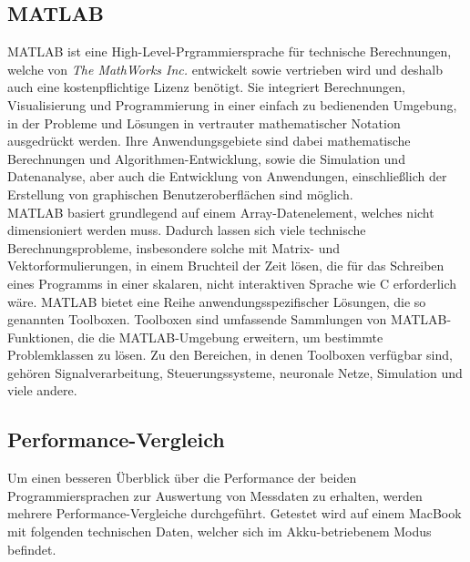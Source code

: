 \subsection{MATLAB}

MATLAB ist eine High-Level-Prgrammiersprache für technische Berechnungen, welche von \textit{The MathWorks Inc.} entwickelt sowie vertrieben wird und deshalb auch eine kostenpflichtige Lizenz benötigt. Sie integriert Berechnungen, Visualisierung und Programmierung in einer einfach zu bedienenden Umgebung, in der Probleme und Lösungen in vertrauter mathematischer Notation ausgedrückt werden. Ihre Anwendungsgebiete sind dabei mathematische Berechnungen und Algorithmen-Entwicklung, sowie die Simulation und Datenanalyse, aber auch die Entwicklung von Anwendungen, einschließlich der Erstellung von graphischen Benutzeroberflächen sind möglich.\\
MATLAB basiert grundlegend auf einem Array-Datenelement, welches nicht dimensioniert werden muss. Dadurch lassen sich viele technische Berechnungsprobleme, insbesondere solche mit Matrix- und Vektorformulierungen, in einem Bruchteil der Zeit lösen, die für das Schreiben eines Programms in einer skalaren, nicht interaktiven Sprache wie C erforderlich wäre. MATLAB bietet eine Reihe anwendungsspezifischer Lösungen, die so genannten Toolboxen. Toolboxen sind umfassende Sammlungen von MATLAB-Funktionen, die die MATLAB-Umgebung erweitern, um bestimmte Problemklassen zu lösen. Zu den Bereichen, in denen Toolboxen verfügbar sind, gehören Signalverarbeitung, Steuerungssysteme, neuronale Netze, Simulation und viele andere.\cite{whatIsMatlab}\cite{whatIsMatlab2}

\subsection{Performance-Vergleich}

Um einen besseren Überblick über die Performance der beiden Programmiersprachen zur Auswertung von Messdaten zu erhalten, werden mehrere Performance-Vergleiche durchgeführt. Getestet wird auf einem MacBook mit folgenden technischen Daten, welcher sich im Akku-betriebenem Modus befindet. 

